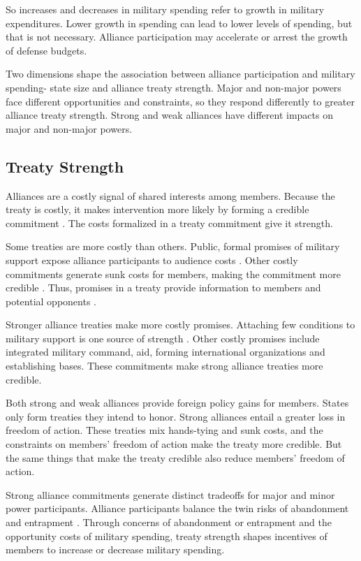 \documentclass[12pt]{article}
\begin{document}
So increases and decreases in military spending refer to growth in military expenditures. 
Lower growth in spending can lead to lower levels of spending, but that is not necessary. 
Alliance participation may accelerate or arrest the growth of defense budgets. 


Two dimensions shape the association between alliance participation and military spending- state size and alliance treaty strength. 
Major and non-major powers face different opportunities and constraints, so they respond differently to greater alliance treaty strength. 
Strong and weak alliances have different impacts on major and non-major powers.


\subsection{Treaty Strength} 

Alliances are a costly signal of shared interests among members.
Because the treaty is costly, it makes intervention more likely by forming a credible commitment \citep{Fearon1997, Morrow2000}. 
The costs formalized in a treaty commitment give it strength. 


Some treaties are more costly than others. 
Public, formal promises of military support expose alliance participants to audience costs \citep{Morrow2000}.
Other costly commitments generate sunk costs for members, making the commitment more credible \citep{Morrow2000}.
Thus, promises in a treaty provide information to members and potential opponents \citep{Leeds2003}.


Stronger alliance treaties make more costly promises. 
Attaching few conditions to military support is one source of strength \citep{Benson2012}.
Other costly promises include integrated military command, aid, forming international organizations and establishing bases. 
These commitments make strong alliance treaties more credible.


Both strong and weak alliances provide foreign policy gains for members. 
States only form treaties they intend to honor. 
Strong alliances entail a greater loss in freedom of action. 
These treaties mix hands-tying and sunk costs, and the constraints on members' freedom of action make the treaty more credible.
But the same things that make the treaty credible also reduce members' freedom of action.  


Strong alliance commitments generate distinct tradeoffs for major and minor power participants. 
Alliance participants balance the twin risks of abandonment and entrapment \citep{Snyder1997, Benson2012}. 
Through concerns of abandonment or entrapment and the opportunity costs of military spending, treaty strength shapes incentives of members to increase or decrease military spending.
\end{document}

